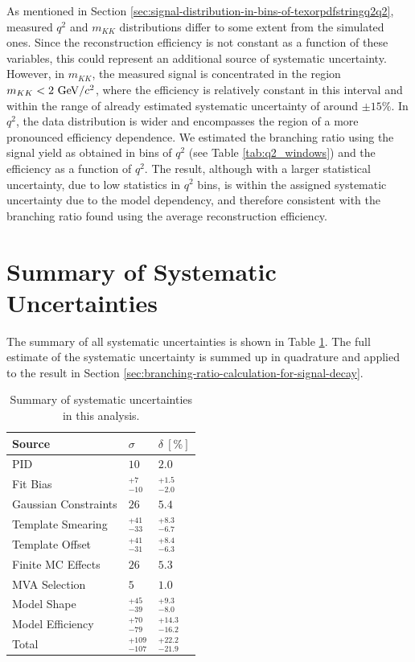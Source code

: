 As mentioned in Section \ref{sec:signal-distribution-in-bins-of-texorpdfstringq2q2}, measured $q^2$ and $m_{KK}$ distributions differ to some extent from the simulated ones. Since the reconstruction efficiency is not constant as a function of these variables, this could represent an additional source of systematic uncertainty. However, in $m_{KK}$, the measured signal is concentrated in the region $m_{KK}<2\mathrm{~GeV}/c^2$, where the efficiency is relatively constant in this interval and within the range of already estimated systematic uncertainty of around $\pm15\%$. In $q^2$, the data distribution is wider and encompasses the region of a more pronounced efficiency dependence. We estimated the branching ratio using the signal yield as obtained in bins of $q^2$ (see Table \ref{tab:q2_windows}) and the efficiency as a function of $q^2$. The result, although with a larger statistical uncertainty, due to low statistics in $q^2$ bins, is within the assigned systematic uncertainty due to the model dependency, and therefore consistent with the branching ratio found using the average reconstruction efficiency.

\section{Summary of Systematic Uncertainties}

The summary of all systematic uncertainties is shown in Table \ref{tab:sys_summary}. The full estimate of the systematic uncertainty is summed up in quadrature and applied to the result in Section \ref{sec:branching-ratio-calculation-for-signal-decay}.


\begin{table}[H]
	\centering
	\begin{tabular}{l|l|l}
		Source & $\sigma$ & $\delta~[\%]$ \\
		\toprule
		PID & $10$ & $2.0$ \\
		Fit Bias & $ {}^{+7}_{-10}$ & ${}^{+1.5}_{-2.0}$ \\
		Gaussian Constraints & $26$ & $5.4$ \\
		Template Smearing & ${}^{+41}_{-33}$ & ${}^{+8.3}_{-6.7}$ \\
		Template Offset & ${}^{+41}_{-31}$ & ${}^{+8.4}_{-6.3}$ \\
		Finite MC Effects & $26$ & $5.3$ \\
		MVA Selection & $5$ & $1.0$\\
		Model Shape & ${}^{+45}_{-39}$ & ${}^{+9.3}_{-8.0}$ \\
		Model Efficiency & ${}^{+70}_{-79}$ & ${}^{+14.3}_{-16.2}$ \\
		\midrule
		Total & ${} ^{+109}_{-107}$ & ${}^{+22.2}_{-21.9}$ \\
		\bottomrule
	\end{tabular}
	\captionsetup{width=0.8\linewidth}
	\caption{Summary of systematic uncertainties in this analysis.}
	\label{tab:sys_summary}
\end{table}







